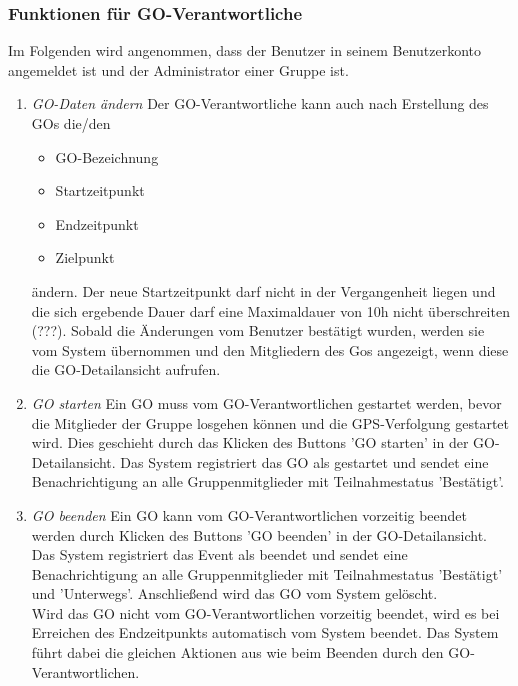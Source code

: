 \documentclass[parskip=full]{scrartcl}
\def\threedigits#1{%
  \ifnum#1<100 0\fi
  \ifnum#1<10 0\fi
  \number#1}
\begin{document}
\subsubsection{Funktionen für GO-Verantwortliche}
Im Folgenden wird angenommen, dass der Benutzer in seinem Benutzerkonto angemeldet ist und der Administrator einer Gruppe ist.

\begin{enumerate}[label={\textbf{/F\protect\threedigits{\theenumi}0/}}, leftmargin=*, resume]	
	\item \textit{GO-Daten ändern}
	Der GO-Verantwortliche kann auch nach Erstellung des GOs die/den
	\begin{itemize}
		\item GO-Bezeichnung
		\item Startzeitpunkt
		\item Endzeitpunkt
		\item Zielpunkt
	\end{itemize}
	ändern. Der neue Startzeitpunkt darf nicht in der Vergangenheit liegen und die sich ergebende Dauer darf eine Maximaldauer von 10h nicht überschreiten (???). Sobald die Änderungen vom Benutzer bestätigt wurden, werden sie vom System übernommen und den Mitgliedern des Gos angezeigt, wenn diese die GO-Detailansicht aufrufen.
	
	\item \textit{GO starten} Ein GO muss vom GO-Verantwortlichen gestartet werden, bevor die Mitglieder der Gruppe \gls{losgehen} können und die GPS-Verfolgung gestartet wird. Dies geschieht durch das Klicken des Buttons 'GO starten' in der GO-Detailansicht. Das System registriert das GO als gestartet und sendet eine Benachrichtigung an alle Gruppenmitglieder mit Teilnahmestatus 'Bestätigt'.
	
	
	\item \textit{GO beenden} Ein GO kann vom GO-Verantwortlichen vorzeitig beendet werden durch Klicken des Buttons 'GO beenden' in der GO-Detailansicht. Das System registriert das Event als beendet und sendet eine Benachrichtigung an alle Gruppenmitglieder mit Teilnahmestatus 'Bestätigt' und 'Unterwegs'. Anschließend wird das GO vom System gelöscht. \\
	Wird das GO nicht vom GO-Verantwortlichen vorzeitig beendet, wird es bei Erreichen des Endzeitpunkts automatisch vom System beendet. Das System führt dabei die gleichen Aktionen aus wie beim Beenden durch den GO-Verantwortlichen.
\end{enumerate}
\end{document}
